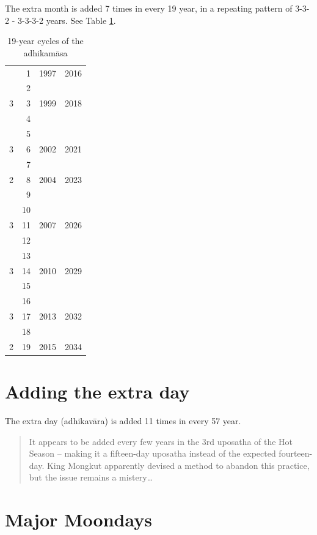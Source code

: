 \documentclass[11pt,oneside]{memoir-article}
\begin{document}
The extra month is added 7 times in every 19 year, in a repeating pattern of
3-3-2 - 3-3-3-2 years. See Table \ref{tbl-19yr-adhikamasa}.

\begin{table}[htb]
\caption{\label{tbl-19yr-adhikamasa}19-year cycles of the adhikamāsa\cite{hasapannyo-zodiac}}
\centering
\begin{tabular}{rrrr}
 & 1 & 1997 & 2016\\
 & 2 &  & \\
3 & 3 & 1999 & 2018\\
 & 4 &  & \\
 & 5 &  & \\
3 & 6 & 2002 & 2021\\
 & 7 &  & \\
2 & 8 & 2004 & 2023\\
 & 9 &  & \\
 & 10 &  & \\
3 & 11 & 2007 & 2026\\
 & 12 &  & \\
 & 13 &  & \\
3 & 14 & 2010 & 2029\\
 & 15 &  & \\
 & 16 &  & \\
3 & 17 & 2013 & 2032\\
 & 18 &  & \\
2 & 19 & 2015 & 2034\\
\end{tabular}
\end{table}

\section{Adding the extra day}
\label{sec-1-3}

The extra day (adhikavāra) is added 11 times in every 57 year.

\begin{quote}
It appears to be added every few years in the 3rd uposatha of the Hot Season
-- making it a fifteen-day uposatha instead of the expected
fourteen-day. King Mongkut apparently devised a method to abandon this
practice, but the issue remains a mistery\ldots{}\cite{hasapannyo-zodiac}
\end{quote}

\section{Major Moondays}
\label{sec-1-4}
\end{document}
